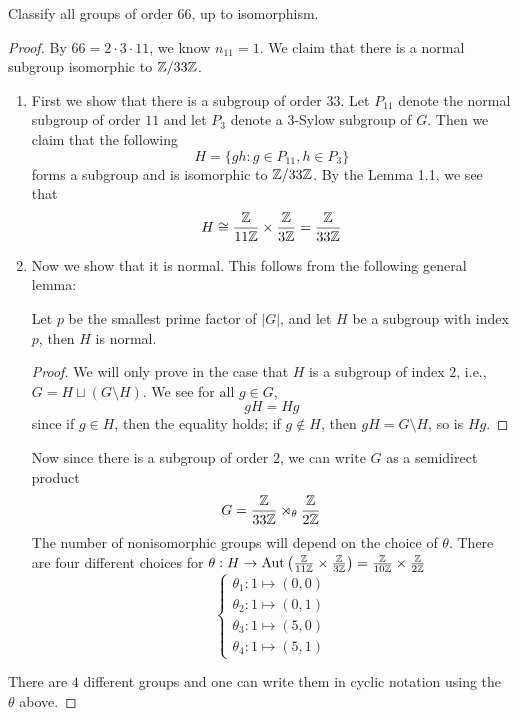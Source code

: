 \begin{prob}[S2016-Q1]
    Classify all groups of order $66$, up to isomorphism.
\end{prob}
\begin{proof}
    By $66=2\cdot 3\cdot 11$, we know $n_{11}=1$. We claim that there is a normal subgroup isomorphic to $\mathbb{Z}/33\mathbb{Z}$. 
    \begin{enumerate}
        \item First we show that there is a subgroup of order $33$. Let $P_{11}$ denote the normal subgroup of order $11$ and let $P_{3}$ denote a $3$-Sylow subgroup of $G$. Then we claim that the following
        \begin{equation*}
            H=\{gh: g\in P_{11}, h\in P_{3}\}
        \end{equation*}
        forms a subgroup and is isomorphic to $\mathbb{Z}/33\mathbb{Z}$. By the Lemma 1.1, we see that 
        \begin{equation*}
            H\cong\frac{\mathbb{Z}}{11\mathbb{Z}}\times\frac{\mathbb{Z}}{3\mathbb{Z}}=\frac{\mathbb{Z}}{33\mathbb{Z}}
        \end{equation*}
        \item Now we show that it is normal. This follows from the following general lemma:
        \begin{lem}
            Let $p$ be the smallest prime factor of $|G|$, and let $H$ be a subgroup with index $p$, then $H$ is normal.
        \end{lem}
        \begin{proof}
            We will only prove in the case that $H$ is a subgroup of index $2$, i.e., $G=H\sqcup (G\setminus H)$. We see for all $g\in G$, 
            \begin{equation*}
                gH=Hg
            \end{equation*}
            since if $g\in H$, then the equality holds; if $g\not\in H$, then $gH=G\setminus H$, so is $Hg$.  
        \end{proof}
        Now since there is a subgroup of order $2$, we can write $G$ as a semidirect product 
        \begin{equation*}
            G=\frac{\mathbb{Z}}{33\mathbb{Z}}\rtimes_\theta \frac{\mathbb{Z}}{2\mathbb{Z}}
        \end{equation*}
        The number of nonisomorphic groups will depend on the choice of $\theta$. There are four different choices for $\theta: H\to\text{Aut}\left(\frac{\mathbb{Z}}{11\mathbb{Z}}\times\frac{\mathbb{Z}}{3\mathbb{Z}}\right)=\frac{\mathbb{Z}}{10\mathbb{Z}}\times\frac{\mathbb{Z}}{2\mathbb{Z}}$
        \begin{equation*}
            \begin{cases}
                \theta_1: 1\mapsto (0,0)\\
                \theta_2: 1\mapsto (0,1)\\
                \theta_3: 1\mapsto (5, 0)\\
                \theta_4: 1\mapsto (5,1)
            \end{cases}
        \end{equation*}
    \end{enumerate} 
    There are $4$ different groups and one can write them in cyclic notation using the $\theta$ above.
\end{proof}



